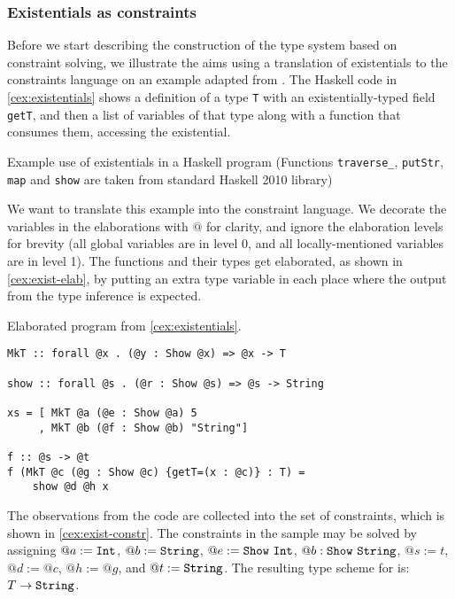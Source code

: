 \subsubsection{Existentials as constraints}

Before we start describing the construction of the type system based on constraint solving, we illustrate the aims using a translation of existentials to the constraints language on an example adapted from \citet{peytonjones2019type}.
The Haskell code in \cref{cex:existentials} shows a definition of a type \lstinline{T} with an existentially-typed field \lstinline{getT}, and then a list of variables of that type along with a function that consumes them, accessing the existential.

\begin{codex}

\caption{Example use of existentials in a Haskell program (Functions \texttt{traverse\_}, \texttt{putStr}, \texttt{map} and \texttt{show} are taken from standard Haskell 2010 library)}
\label{cex:existentials}
\end{codex}

We want to translate this example into the constraint language. We decorate the variables in the elaborations with $@$ for clarity, and ignore the elaboration levels for brevity (all global variables are in level 0, and all locally-mentioned variables are in level 1). The functions and their types get elaborated, as shown in \cref{cex:exist-elab}, by putting an extra type variable in each place where the output from the type inference is expected.


\begin{codex}
\caption{Elaborated program from \cref{cex:existentials}.}
\label{cex:exist-elab}
\begin{lstlisting}[style=haskellStyle]
MkT :: forall @x . (@y : Show @x) => @x -> T

show :: forall @s . (@r : Show @s) => @s -> String

xs = [ MkT @a (@e : Show @a) 5
     , MkT @b (@f : Show @b) "String"]

f :: @s -> @t
f (MkT @c (@g : Show @c) {getT=(x : @c)} : T) =
    show @d @h x
\end{lstlisting}
\end{codex}

The observations from the code are collected into the set of constraints, which is shown in \cref{cex:exist-constr}. The constraints in the sample may be solved by assigning $@a := \mathtt{Int}$, $@b := \mathtt{String}$, $@e := \mathtt{Show}\ \mathtt{Int}$, $@b : \mathtt{Show}\ \mathtt{String}$, $@s := t$, $@d := @c$, $@h := @g$, and $@t := \mathtt{String}$. The resulting type scheme for  is: $T \to \mathtt{String}$.


